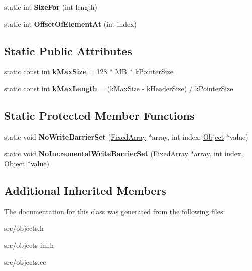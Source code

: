 \begin{DoxyCompactItemize}
\item 
\hypertarget{classv8_1_1internal_1_1_fixed_array_aac41d653d6c61ad3a0fd907c2a52fd92}{}static int {\bfseries Size\+For} (int length)\label{classv8_1_1internal_1_1_fixed_array_aac41d653d6c61ad3a0fd907c2a52fd92}

\item 
\hypertarget{classv8_1_1internal_1_1_fixed_array_a40b2c3d748284f90693919d8119a14fb}{}static int {\bfseries Offset\+Of\+Element\+At} (int index)\label{classv8_1_1internal_1_1_fixed_array_a40b2c3d748284f90693919d8119a14fb}

\end{DoxyCompactItemize}
\subsection*{Static Public Attributes}
\begin{DoxyCompactItemize}
\item 
\hypertarget{classv8_1_1internal_1_1_fixed_array_a8c4e197164657e0b412e83afcab550ae}{}static const int {\bfseries k\+Max\+Size} = 128 $\ast$ M\+B $\ast$ k\+Pointer\+Size\label{classv8_1_1internal_1_1_fixed_array_a8c4e197164657e0b412e83afcab550ae}

\item 
\hypertarget{classv8_1_1internal_1_1_fixed_array_affb031e7f10c06f0dd174029fc56efe2}{}static const int {\bfseries k\+Max\+Length} = (k\+Max\+Size -\/ k\+Header\+Size) / k\+Pointer\+Size\label{classv8_1_1internal_1_1_fixed_array_affb031e7f10c06f0dd174029fc56efe2}

\end{DoxyCompactItemize}
\subsection*{Static Protected Member Functions}
\begin{DoxyCompactItemize}
\item 
\hypertarget{classv8_1_1internal_1_1_fixed_array_a522aa22b6c539f4427e80b2178a96197}{}static void {\bfseries No\+Write\+Barrier\+Set} (\hyperlink{classv8_1_1internal_1_1_fixed_array}{Fixed\+Array} $\ast$array, int index, \hyperlink{classv8_1_1internal_1_1_object}{Object} $\ast$value)\label{classv8_1_1internal_1_1_fixed_array_a522aa22b6c539f4427e80b2178a96197}

\item 
\hypertarget{classv8_1_1internal_1_1_fixed_array_a5fbc2c3658dcf1c15afdb285714774da}{}static void {\bfseries No\+Incremental\+Write\+Barrier\+Set} (\hyperlink{classv8_1_1internal_1_1_fixed_array}{Fixed\+Array} $\ast$array, int index, \hyperlink{classv8_1_1internal_1_1_object}{Object} $\ast$value)\label{classv8_1_1internal_1_1_fixed_array_a5fbc2c3658dcf1c15afdb285714774da}

\end{DoxyCompactItemize}
\subsection*{Additional Inherited Members}


The documentation for this class was generated from the following files\+:\begin{DoxyCompactItemize}
\item 
src/objects.\+h\item 
src/objects-\/inl.\+h\item 
src/objects.\+cc\end{DoxyCompactItemize}

